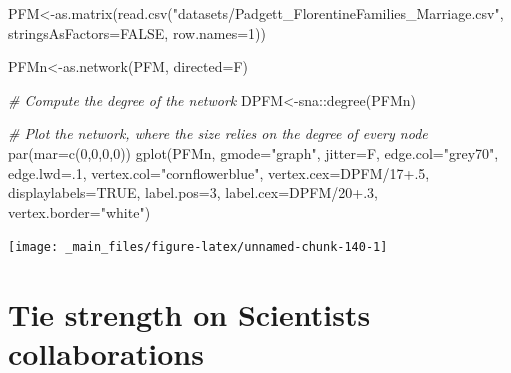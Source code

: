 \documentclass[
  notitlepage,
  onecolumn,
  openany]{book}
\newenvironment{Shaded}{\begin{snugshade}}{\end{snugshade}}
\newcommand{\AttributeTok}[1]{\textcolor[rgb]{0.77,0.63,0.00}{#1}}
\newcommand{\CommentTok}[1]{\textcolor[rgb]{0.56,0.35,0.01}{\textit{#1}}}
\newcommand{\ConstantTok}[1]{\textcolor[rgb]{0.00,0.00,0.00}{#1}}
\newcommand{\DecValTok}[1]{\textcolor[rgb]{0.00,0.00,0.81}{#1}}
\newcommand{\FloatTok}[1]{\textcolor[rgb]{0.00,0.00,0.81}{#1}}
\newcommand{\FunctionTok}[1]{\textcolor[rgb]{0.00,0.00,0.00}{#1}}
\newcommand{\NormalTok}[1]{#1}
\newcommand{\OtherTok}[1]{\textcolor[rgb]{0.56,0.35,0.01}{#1}}
\newcommand{\SpecialCharTok}[1]{\textcolor[rgb]{0.00,0.00,0.00}{#1}}
\newcommand{\StringTok}[1]{\textcolor[rgb]{0.31,0.60,0.02}{#1}}
\begin{document}
\begin{Shaded}
\begin{Highlighting}[]
\NormalTok{PFM}\OtherTok{\textless{}{-}}\FunctionTok{as.matrix}\NormalTok{(}\FunctionTok{read.csv}\NormalTok{(}\StringTok{"datasets/Padgett\_FlorentineFamilies\_Marriage.csv"}\NormalTok{,}
                        \AttributeTok{stringsAsFactors=}\ConstantTok{FALSE}\NormalTok{, }\AttributeTok{row.names=}\DecValTok{1}\NormalTok{))}

\NormalTok{PFMn}\OtherTok{\textless{}{-}}\FunctionTok{as.network}\NormalTok{(PFM, }\AttributeTok{directed=}\NormalTok{F)}

\CommentTok{\# Compute the degree of the network}
\NormalTok{DPFM}\OtherTok{\textless{}{-}}\NormalTok{sna}\SpecialCharTok{::}\FunctionTok{degree}\NormalTok{(PFMn)}

\CommentTok{\# Plot the network, where the size relies on the degree of every node}
\FunctionTok{par}\NormalTok{(}\AttributeTok{mar=}\FunctionTok{c}\NormalTok{(}\DecValTok{0}\NormalTok{,}\DecValTok{0}\NormalTok{,}\DecValTok{0}\NormalTok{,}\DecValTok{0}\NormalTok{))}
\FunctionTok{gplot}\NormalTok{(PFMn, }
      \AttributeTok{gmode=}\StringTok{"graph"}\NormalTok{, }
      \AttributeTok{jitter=}\NormalTok{F,}
      \AttributeTok{edge.col=}\StringTok{"grey70"}\NormalTok{,}
      \AttributeTok{edge.lwd=}\NormalTok{.}\DecValTok{1}\NormalTok{, }
      \AttributeTok{vertex.col=}\StringTok{"cornflowerblue"}\NormalTok{,}
      \AttributeTok{vertex.cex=}\NormalTok{DPFM}\SpecialCharTok{/}\DecValTok{17}\FloatTok{+.5}\NormalTok{,}
      \AttributeTok{displaylabels=}\ConstantTok{TRUE}\NormalTok{, }
      \AttributeTok{label.pos=}\DecValTok{3}\NormalTok{, }
      \AttributeTok{label.cex=}\NormalTok{DPFM}\SpecialCharTok{/}\DecValTok{20}\FloatTok{+.3}\NormalTok{, }
      \AttributeTok{vertex.border=}\StringTok{"white"}\NormalTok{)}
\end{Highlighting}
\end{Shaded}

\begin{center}\texttt{[image: \_main\_files/figure-latex/unnamed-chunk-140-1]} \end{center}

\hypertarget{tie-strength-on-scientists-collaborations}{%
\section{Tie strength on Scientists collaborations}\label{tie-strength-on-scientists-collaborations}}
\end{document}
